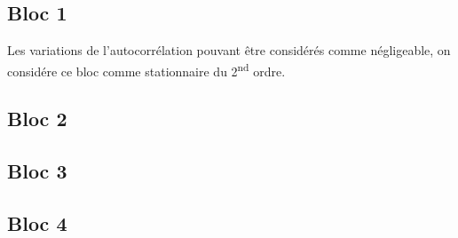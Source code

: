 \documentclass[french, a4paper, 12pt, openany]{book}
\begin{document}
  \subsection{Bloc 1}
  Les variations de l'autocorrélation pouvant être considérés comme négligeable, on considére ce bloc comme stationnaire du 2\textsuperscript{nd} ordre.
  \subsection{Bloc 2}
  \subsection{Bloc 3}
  \subsection{Bloc 4}
\end{document}
